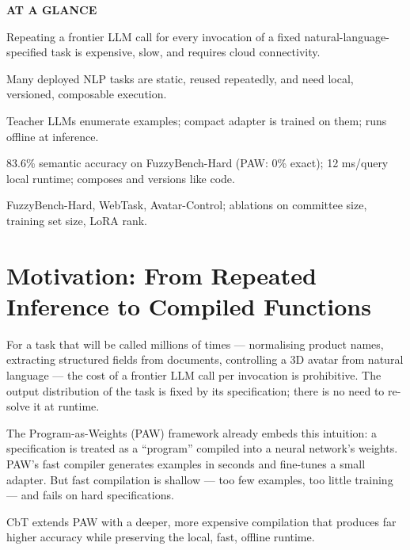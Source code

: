 \documentclass[10pt,twocolumn]{article}
\begin{document}
\begin{mdframed}[backgroundcolor=boxgray,linecolor=rulered,linewidth=1pt,
    innerleftmargin=6pt,innerrightmargin=6pt,
    innertopmargin=6pt,innerbottommargin=6pt]
\textbf{\small AT A GLANCE}\par\vspace{4pt}
\begin{description}[leftmargin=0pt,labelsep=4pt,itemsep=2pt,parsep=0pt,
    font=\small\bfseries]
  \item[Problem:] Repeating a frontier LLM call for every invocation
    of a fixed natural-language-specified task is expensive, slow, and
    requires cloud connectivity.
  \item[Why it matters:] Many deployed NLP tasks are static, reused
    repeatedly, and need local, versioned, composable execution.
  \item[Method:] Teacher LLMs enumerate examples; compact adapter
    is trained on them; runs offline at inference.
  \item[Result:] 83.6\% semantic accuracy on FuzzyBench-Hard (PAW: 0\%
    exact); 12 ms/query local runtime; composes and versions like code.
  \item[Evidence:] FuzzyBench-Hard, WebTask, Avatar-Control; ablations
    on committee size, training set size, LoRA rank.
\end{description}
\end{mdframed}

\section{Motivation: From Repeated Inference to Compiled Functions}

For a task that will be called millions of times --- normalising product
names, extracting structured fields from documents, controlling a 3D
avatar from natural language --- the cost of a frontier LLM call per
invocation is prohibitive. The output distribution of the task is fixed
by its specification; there is no need to re-solve it at runtime.

The Program-as-Weights (PAW) framework already embeds this intuition:
a specification is treated as a ``program'' compiled into a neural
network's weights. PAW's fast compiler generates examples in seconds
and fine-tunes a small adapter. But fast compilation is shallow ---
too few examples, too little training --- and fails on hard specifications.

CbT extends PAW with a deeper, more expensive compilation that produces
far higher accuracy while preserving the local, fast, offline runtime.
\end{document}
